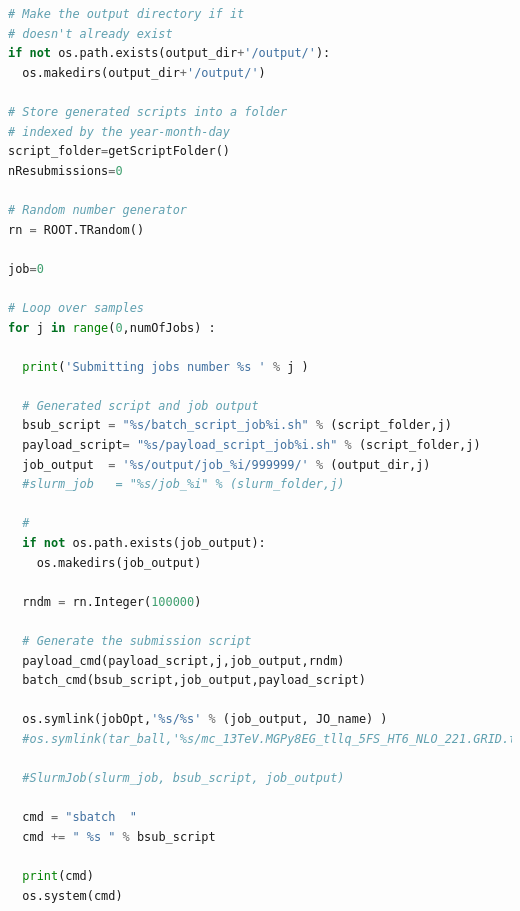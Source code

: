 \documentclass[NOTE, REPORT=true, atlasdraft=true, USenglish]{atlasdoc}
\begin{document}
\begin{lstlisting}[language=Python, caption=Job Configuration python script]
# Make the output directory if it
# doesn't already exist
if not os.path.exists(output_dir+'/output/'):
  os.makedirs(output_dir+'/output/')

# Store generated scripts into a folder
# indexed by the year-month-day
script_folder=getScriptFolder()
nResubmissions=0

# Random number generator
rn = ROOT.TRandom()

job=0

# Loop over samples
for j in range(0,numOfJobs) :

  print('Submitting jobs number %s ' % j )

  # Generated script and job output 
  bsub_script = "%s/batch_script_job%i.sh" % (script_folder,j)
  payload_script= "%s/payload_script_job%i.sh" % (script_folder,j)
  job_output  = '%s/output/job_%i/999999/' % (output_dir,j)
  #slurm_job   = "%s/job_%i" % (slurm_folder,j)

  #
  if not os.path.exists(job_output):
    os.makedirs(job_output)

  rndm = rn.Integer(100000)

  # Generate the submission script
  payload_cmd(payload_script,j,job_output,rndm)
  batch_cmd(bsub_script,job_output,payload_script)

  os.symlink(jobOpt,'%s/%s' % (job_output, JO_name) )
  #os.symlink(tar_ball,'%s/mc_13TeV.MGPy8EG_tllq_5FS_HT6_NLO_221.GRID.tar.gz' % (job_output))

  #SlurmJob(slurm_job, bsub_script, job_output)

  cmd = "sbatch  "
  cmd += " %s " % bsub_script
 
  print(cmd)
  os.system(cmd)

\end{lstlisting}
\clearpage
\end{document}
